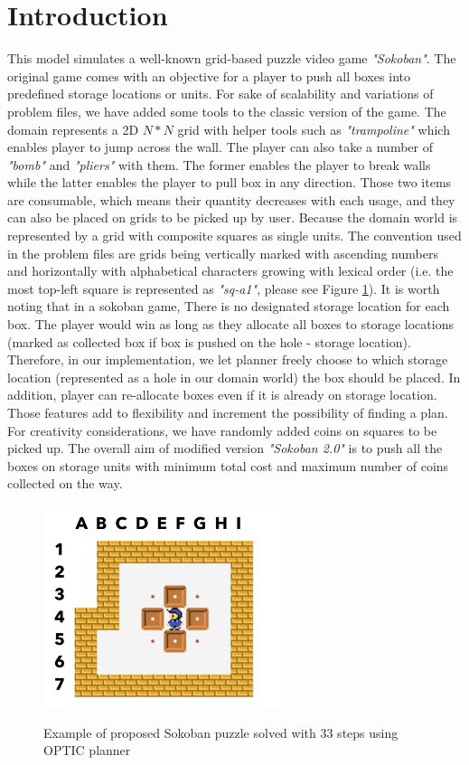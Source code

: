 \documentclass[letterpaper]{article} %
\begin{document}
\section{Introduction}
This model simulates a well-known grid-based puzzle video game \emph{"Sokoban"}. The original game comes with an 
objective for a player to push all boxes into predefined storage locations or units. For sake of scalability
and variations of problem files, we have added some tools to the classic version of the game. The domain represents
a 2D \(N*N\) grid with helper tools such as \emph{"trampoline"} which enables player to jump across the wall.
The player can also take a number of \emph{"bomb"} and \emph{"pliers"} with them. The former enables the player to
break walls while the latter enables the player to pull box in any direction. Those two items are consumable, which
means their quantity decreases with each usage, and they can also be placed on grids to be picked up by user.
Because the domain world is represented by a grid with composite squares as single units. The convention used in the 
problem files are grids being vertically marked with ascending numbers and horizontally with alphabetical characters 
growing with lexical order (i.e. the most top-left square is represented as \emph{"sq-a1"}, please see Figure \ref{fig:example}).  
It is worth noting that in a sokoban game, There is no designated storage location for each box. The player
would win as long as they allocate all boxes to storage locations (marked as collected box if box is pushed on the hole
- storage location). Therefore, in our implementation, we let planner freely choose to which storage location 
(represented as a hole in our domain world) the box should be placed. In addition, player can re-allocate boxes even 
if it is already on storage location. Those features add to flexibility and increment the possibility of finding a 
plan. For creativity considerations, we have randomly added coins on squares to be picked up. The overall aim of modified
version \emph{"Sokoban 2.0"} is to push all the boxes on storage units with minimum total cost and maximum number of coins collected on the way.  
\begin{figure}
    \includegraphics[width=2.8in]{figure1.JPG} \\
    \caption{Example of proposed Sokoban puzzle solved with 33 steps using OPTIC planner}\label{fig:example}
\end{figure}
\end{document}
